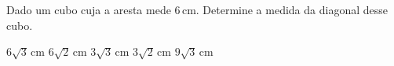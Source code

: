 Dado um cubo cuja a aresta mede $6$\,cm. Determine a medida da diagonal desse cubo.

$6\sqrt{3}$\,cm
$6\sqrt{2}$\,cm
$3\sqrt{3}$\,cm
$3\sqrt{2}$\,cm
$9\sqrt{3}$\,cm


